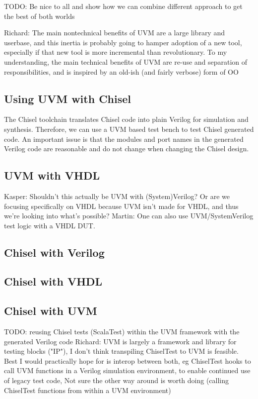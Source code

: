 \documentclass[a4paper, conference]{IEEEtran}
\newcommand{\todo}[1]{{\color{olive} TODO: #1}}
\newcommand{\martin}[1]{{\color{blue} Martin: #1}}
\newcommand{\ducky}[1]{{\color{orange} Richard: #1}}
\newcommand{\kasper}[1]{{\color{purple} Kasper: #1}}
\begin{document}
\todo{Be nice to all and show how we can combine different approach to
get the best of both worlds}

\ducky{The main nontechnical benefits of UVM are a large library and userbase, and this inertia is probably going to hamper adoption of a new tool, especially if that new tool is more incremental than revolutionary. To my understanding, the main technical benefits of UVM are re-use and separation of responsibilities, and is inspired by an old-ish (and fairly verbose) form of OO}

\subsection{Using UVM with Chisel}

The Chisel toolchain translates Chisel code into plain Verilog for simulation and
synthesis. Therefore, we can use a UVM based test bench to test Chisel generated code.
An important issue is that the modules and port names in the generated Verilog
code are reasonable and do not change when changing the Chisel design.

\subsection{UVM with VHDL}
\kasper{Shouldn't this actually be UVM with (System)Verilog? Or are we focusing specifically on VHDL because UVM isn't made for VHDL, and thus we're looking into what's possible?}
\martin{One can also use UVM/SystemVerilog test logic with a VHDL DUT.}

\subsection{Chisel with Verilog}

\subsection{Chisel with VHDL}

\subsection{Chisel with UVM}

\todo{reusing Chisel tests (ScalaTest) within the UVM framework
with the generated Verilog code}
\ducky{UVM is largely a framework and library for testing blocks ("IP"), I don't think transpiling ChiselTest to UVM is feasible. Best I would practically hope for is interop between both, eg ChiselTest hooks to call UVM functions in a Verilog simulation environment, to enable continued use of legacy test code, Not sure the other way around is worth doing (calling ChiselTest functions from within a UVM environment)}
\end{document}
